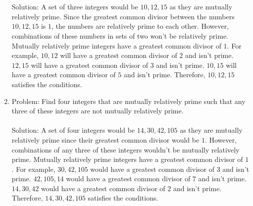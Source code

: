 \documentclass[]{article}
\begin{document}
\begin{enumerate}
    \\\\ Solution: A set of three integers would be $10,12,15$ as they are mutually relatively prime. Since the greatest common divisor between the numbers $10, 12, 15$ is $1$, the numbers are relatively prime to each other. However, combinations of these numbers in sets of two won't be relatively prime. Mutually relatively prime integers have a greatest common divisor of $1$. For example, $10,12$ will have a greatest common divisor of $2$ and isn't prime. $12,15$ will have a greatest common divisor of $3$ and isn't prime. $10,15$ will have a greatest common divisor of $5$ and isn't prime. Therefore, $10,12,15$ satisfies the conditions.
    \item Problem: Find four integers that are mutually relatively prime such that any three of these integers are not mutually relatively prime.
    \\\\Solution: A set of four integers would be $14,30,42,105$ as they are mutually relatively prime since their greatest common divisor would be $1$. However, combinations of any three of these integers wouldn't be mutually relatively prime. Mutually relatively prime integers have a greatest common divisor of $1$. For example, $30, 42, 105$ would have a greatest common divisor of $3$ and isn't prime. $42, 105, 14$ would have a greatest common divisor of $7$ and isn't prime. $14, 30, 42$ would have a greatest common divisor of $2$ and isn't prime. Therefore, $14,30,42,105$ satisfies the conditions.
 
\end{enumerate}
\end{document}
